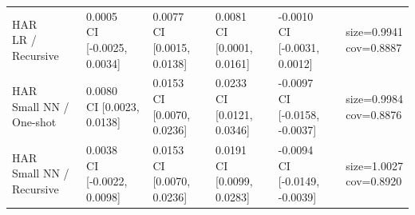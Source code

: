 \begin{table}[t]
\begin{tabular}{llllll}
\shortstack{HAR\\LR / Recursive} & \shortstack{0.0005\\CI [-0.0025, 0.0034]} & \shortstack{0.0077\\CI [0.0015, 0.0138]} & \shortstack{0.0081\\CI [0.0001, 0.0161]} & \shortstack{-0.0010\\CI [-0.0031, 0.0012]} & \shortstack{size=0.9941\\cov=0.8887} \\
\shortstack{HAR\\Small NN / One-shot} & \shortstack{0.0080\\CI [0.0023, 0.0138]} & \shortstack{0.0153\\CI [0.0070, 0.0236]} & \shortstack{0.0233\\CI [0.0121, 0.0346]} & \shortstack{-0.0097\\CI [-0.0158, -0.0037]} & \shortstack{size=0.9984\\cov=0.8876} \\
\shortstack{HAR\\Small NN / Recursive} & \shortstack{0.0038\\CI [-0.0022, 0.0098]} & \shortstack{0.0153\\CI [0.0070, 0.0236]} & \shortstack{0.0191\\CI [0.0099, 0.0283]} & \shortstack{-0.0094\\CI [-0.0149, -0.0039]} & \shortstack{size=1.0027\\cov=0.8920} \\
\hline
\end{tabular}
\end{table}
